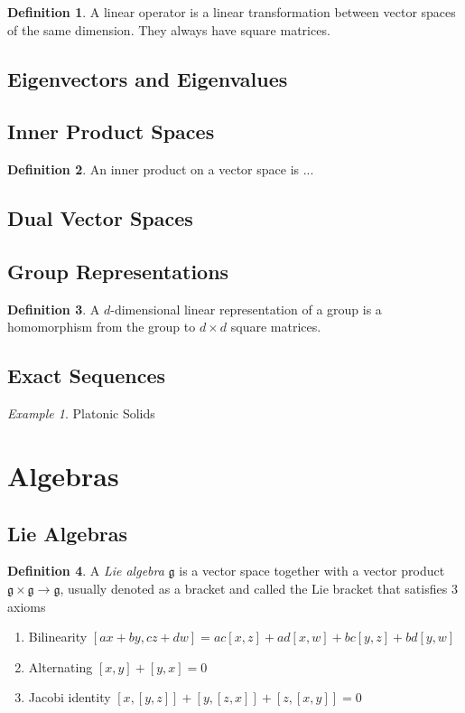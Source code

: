 \documentclass[12pt]{article}
\theoremstyle{definition}
\newtheorem{definition}{Definition}[section]
\theoremstyle{remark}
\theoremstyle{example}
\newtheorem{example}{Example}
\begin{document}
\begin{definition}
	A linear operator is a linear transformation between vector spaces of the same dimension. They always have square matrices.
\end{definition}

\subsection{Eigenvectors and Eigenvalues}

\subsection{Inner Product Spaces}

\begin{definition}
	An inner product on a vector space is ...
\end{definition}

\subsection{Dual Vector Spaces}

\subsection{Group Representations}

\begin{definition}
	A $d$-dimensional linear representation of a group is a homomorphism from the group to $d\times d$ square matrices.
\end{definition}

\subsection{Exact Sequences}

\begin{example}
	Platonic Solids
\end{example}

\section{Algebras}

\subsection{Lie Algebras}

\begin{definition}
	A \textit{Lie algebra} $\mathfrak{g}$ is a vector space together with a vector product $\mathfrak{g}\times\mathfrak{g}\to\mathfrak{g}$, usually denoted as a bracket and called the Lie bracket that satisfies 3 axioms
	\begin{enumerate}
		\item Bilinearity
		\subitem $[ax+by,cz+dw]=ac[x,z]+ad[x,w]+bc[y,z]+bd[y,w]$
		\item Alternating
		\subitem $[x,y]+[y,x]=0$
		\item Jacobi identity
		\subitem $[x,[y,z]]+[y,[z,x]]+[z,[x,y]]=0$
	\end{enumerate}
\end{definition}
\end{document}
